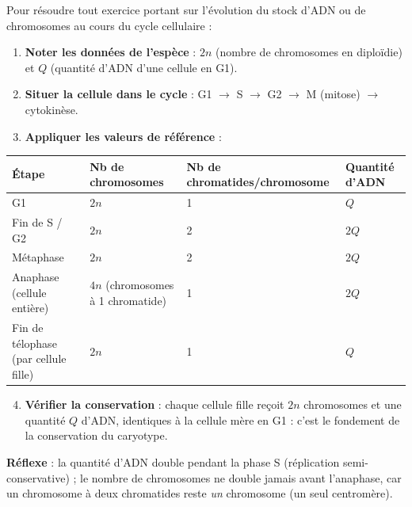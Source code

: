 \documentclass[11pt]{article}
\newcommand{\cle}[1]{{\popxbold\color{popdark}#1}}
\begin{document}
\begin{methode}
Pour résoudre tout exercice portant sur l'évolution du stock d'ADN ou de chromosomes au cours du cycle cellulaire :
\begin{enumerate}
\item \textbf{Noter les données de l'espèce} : $2n$ (nombre de chromosomes en diploïdie) et $Q$ (quantité d'ADN d'une cellule en G1).
\item \textbf{Situer la cellule dans le cycle} : G1 $\rightarrow$ S $\rightarrow$ G2 $\rightarrow$ M (mitose) $\rightarrow$ cytokinèse.
\item \textbf{Appliquer les valeurs de référence} :
\end{enumerate}
\begin{center}
\begin{tabularx}{\linewidth}{|l|X|X|X|}
\hline
\rowcolor{popblueL} \textbf{Étape} & \textbf{Nb de chromosomes} & \textbf{Nb de chromatides/chromosome} & \textbf{Quantité d'ADN} \\
\hline
G1 & $2n$ & 1 & $Q$ \\
\hline
Fin de S / G2 & $2n$ & 2 & $2Q$ \\
\hline
Métaphase & $2n$ & 2 & $2Q$ \\
\hline
Anaphase (cellule entière) & $4n$ (chromosomes à 1 chromatide) & 1 & $2Q$ \\
\hline
Fin de télophase (par cellule fille) & $2n$ & 1 & $Q$ \\
\hline
\end{tabularx}
\end{center}
\begin{enumerate}
\setcounter{enumi}{3}
\item \textbf{Vérifier la conservation} : chaque cellule fille reçoit $2n$ chromosomes et une quantité $Q$ d'ADN, identiques à la cellule mère en G1 : c'est le fondement de la \cle{conservation du caryotype}.
\end{enumerate}
\textbf{Réflexe} : la quantité d'ADN double pendant la phase S (réplication semi-conservative) ; le nombre de chromosomes ne double jamais avant l'anaphase, car un chromosome à deux chromatides reste \emph{un} chromosome (un seul centromère).
\end{methode}
\end{document}
